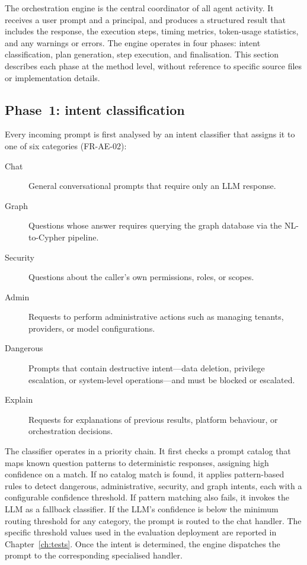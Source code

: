 \documentclass[a4paper,noexaminfo]{sapthesis}
\begin{document}
The orchestration engine is the central coordinator of all agent activity.
It receives a user prompt and a principal, and produces a structured
result that includes the response, the execution steps, timing metrics,
token-usage statistics, and any warnings or errors.  The engine operates
in four phases: intent classification,
plan generation, step execution, and finalisation.  This section
describes each phase at the method level, without reference to specific
source files or implementation details.

\subsection{Phase~1: intent classification}

Every incoming prompt is first analysed by an intent classifier that
assigns it to one of six categories (FR-AE-02):

\begin{description}
    \item[Chat] General conversational prompts that require only an LLM
        response.
    \item[Graph] Questions whose answer requires querying the graph
        database via the NL-to-Cypher pipeline.
    \item[Security] Questions about the caller's own permissions, roles,
        or scopes.
    \item[Admin] Requests to perform administrative actions such as
        managing tenants, providers, or model configurations.
    \item[Dangerous] Prompts that contain destructive intent---data
        deletion, privilege escalation, or system-level operations---and
        must be blocked or escalated.
    \item[Explain] Requests for explanations of previous results, platform
        behaviour, or orchestration decisions.
\end{description}

The classifier operates in a priority chain.  It first checks a prompt
catalog that maps known question patterns to deterministic responses,
assigning high confidence on a match.  If no catalog match is found, it
applies pattern-based rules to detect dangerous, administrative, security,
and graph intents, each with a configurable confidence threshold.  If
pattern matching also fails, it invokes the LLM as a fallback classifier.
If the LLM's confidence is below the minimum routing threshold for any
category, the prompt is routed to the chat handler.  The specific
threshold values used in the evaluation deployment are reported in
Chapter~\ref{ch:tests}.  Once the intent is determined, the engine
dispatches the prompt to the corresponding specialised handler.
\end{document}
